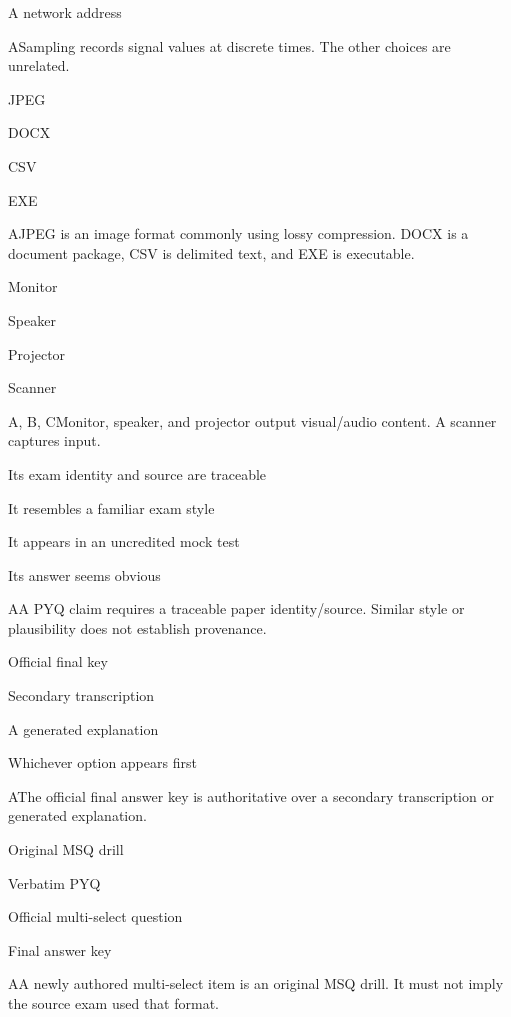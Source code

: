 \begin{enumerate}[label=\textbf{Q\arabic*.}, leftmargin=*]
{   \item A network address}
  {A}{Sampling records signal values at discrete times. The other choices are unrelated.}
  {\item JPEG
   \item DOCX
   \item CSV
   \item EXE}
  {A}{JPEG is an image format commonly using lossy compression. DOCX is a document package, CSV is delimited text, and EXE is executable.}
  {\item Monitor
   \item Speaker
   \item Projector
   \item Scanner}
  {A, B, C}{Monitor, speaker, and projector output visual/audio content. A scanner captures input.}
\fi
\ifnum{}
  {\item Its exam identity and source are traceable
   \item It resembles a familiar exam style
   \item It appears in an uncredited mock test
   \item Its answer seems obvious}
  {A}{A PYQ claim requires a traceable paper identity/source. Similar style or plausibility does not establish provenance.}
  {\item Official final key
   \item Secondary transcription
   \item A generated explanation
   \item Whichever option appears first}
  {A}{The official final answer key is authoritative over a secondary transcription or generated explanation.}
  {\item Original MSQ drill
   \item Verbatim PYQ
   \item Official multi-select question
   \item Final answer key}
  {A}{A newly authored multi-select item is an original MSQ drill. It must not imply the source exam used that format.}

\end{enumerate}
